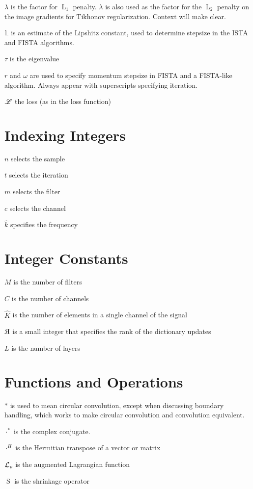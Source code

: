 \documentclass{article}
\begin{document}
$\lambda$ is the factor for $\operatorname{L}_1$ penalty.  $\lambda$ is also used as the factor for the $\operatorname{L}_2$ penalty on the image gradients for Tikhonov regularization. Context will make clear.

$\mathbb{L}$ is an estimate of the Lipshitz constant, used to determine stepsize in the ISTA and FISTA algorithms.

$\tau$ is the eigenvalue

$r$ and $\omega$ are used to specify momentum stepsize in FISTA and a FISTA-like algorithm. Always appear with superscripts specifying iteration.

$\mathscr{L}$ the loss (as in the loss function)

\section{Indexing Integers}
$n$ selects the sample

$t$ selects the iteration

$m$ selects the filter

$c$ selects the channel

$\hat{k}$ specifies the frequency

\section{Integer Constants}
$M$ is the number of filters

$C$ is the number of channels

$\hat{K}$ is the number of elements in a single channel of the signal

$\reflectbox{R}$ is a small integer that specifies the rank of the dictionary updates

$L$ is the number of layers

\section{Functions and Operations}
$*$ is used to mean circular convolution, except when discussing boundary handling, which works to make circular convolution and convolution equivalent.

$\cdot^{*}$ is the complex conjugate.

$\cdot^H$ is the Hermitian transpose of a vector or matrix

$\mathcal{L}_{\rho}$ is the augmented Lagrangian function

$\operatorname{S}$ is the shrinkage operator
\end{document}
